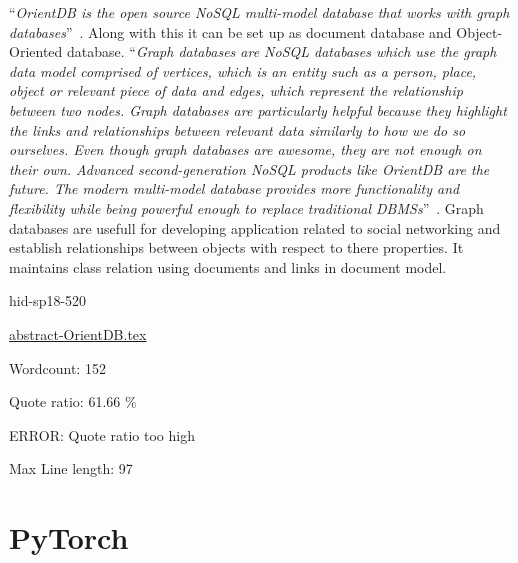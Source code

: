 \color{blue}``\emph{OrientDB is the open source NoSQL multi-model database that works with graph 
databases}''\color{black}~\cite{hid-sp18-520-OrientDB}. Along with this it can be set up as 
document database and Object-Oriented database. 
\color{blue}``\emph{Graph databases are NoSQL databases which use the graph data model comprised 
of vertices, which is an entity such as a person, place, object or relevant 
piece of data and edges, which represent the relationship between two nodes.
Graph databases are particularly helpful because they highlight the links and
relationships between relevant data similarly to how we do so ourselves.
Even though graph databases are awesome, they are not enough on their own.
Advanced second-generation NoSQL products like OrientDB are the future. The 
modern multi-model database provides more functionality and flexibility while
being powerful enough to replace traditional 
DBMSs}''\color{black}~\cite{hid-sp18-520-OrientDB-graph}.
Graph databases are usefull for developing application related to social 
networking and establish relationships between objects with respect to there 
properties. It maintains class relation using documents and links in document 
model.


\begin{IU}

hid-sp18-520

\href{https://github.com/cloudmesh-community/hid-sp18-520/blob/master//technology/abstract-OrientDB.tex}{abstract-OrientDB.tex}

 

Wordcount: 152


Quote ratio: 61.66 \%

ERROR: Quote ratio too high
 
Max Line length: 97
\end{IU}

\section{PyTorch}

